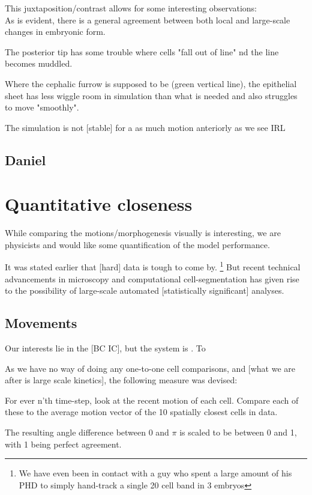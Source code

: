 This juxtaposition/contrast allows for some interesting observations:\\
As is evident, there is a general agreement between both local and large-scale changes in embryonic form. 

The posterior tip has some trouble where cells "fall out of line" nd the line becomes muddled.

Where the cephalic furrow is supposed to be (green vertical line), the epithelial sheet has less wiggle room in simulation than what is needed and also struggles to move "smoothly". 

The simulation is not [stable] for a as much motion anteriorly as we see IRL





\subsection{Daniel}
\section{Quantitative closeness}
While comparing the motions/morphogenesis visually is interesting, we are physicists and would like some quantification of the model performance.

It was stated earlier that [hard] data is tough to come by. \footnote{We have even been in contact with a guy who spent a large amount of his PHD to simply hand-track a single 20 cell band in 3 embryos} But recent technical advancements in microscopy and computational cell-segmentation has given rise to the possibility of large-scale automated [statistically significant] analyses. 
\subsection{Movements}

Our interests lie in the [BC IC], but the system is . To 

As we have no way of doing any one-to-one cell comparisons, and [what we are after is large scale kinetics], the following measure was devised: 

For ever n'th time-step, look at the recent motion of each cell. Compare each of these to the average motion vector of the 10 spatially closest cells in data. 


The resulting angle difference between 0 and $\pi$ is scaled to be between 0 and 1, with 1 being perfect agreement.

